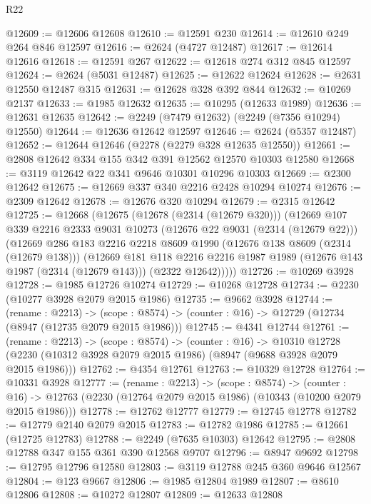 \begin{lexlean}{R22}
\begin{coremodule}
@12609 := @12606 @12608
@12610 := @12591 @230
@12614 := @12610 @249 @264 @846 @12597
@12616 := @2624 (@4727 @12487)
@12617 := @12614 @12616
@12618 := @12591 @267
@12622 := @12618 @274 @312 @845 @12597
@12624 := @2624 (@5031 @12487)
@12625 := @12622 @12624
@12628 := @2631 @12550 @12487 @315
@12631 := @12628 @328 @392 @844
@12632 := @10269 @2137
@12633 := @1985 @12632
@12635 := @10295 (@12633 @1989)
@12636 := @12631 @12635
@12642 := @2249 (@7479 @12632) (@2249 (@7356 @10294) @12550)
@12644 := @12636 @12642 @12597
@12646 := @2624 (@5357 @12487)
@12652 := @12644 @12646 (@2278 (@2279 @328 @12635 @12550))
@12661 := @2808 @12642 @334 @155 @342 @391 @12562 @12570 @10303 @12580
@12668 := @3119 @12642 @22 @341 @9646 @10301 @10296 @10303
@12669 := @2300 @12642
@12675 := @12669 @337 @340 @2216 @2428 @10294 @10274
@12676 := @2309 @12642
@12678 := @12676 @320 @10294
@12679 := @2315 @12642
@12725 := @12668
    (@12675
      (@12678 (@2314 (@12679 @320)))
      (@12669
        @107
        @339
        @2216
        @2333
        @9031
        @10273
        (@12676 @22 @9031 (@2314 (@12679 @22)))
        (@12669
          @286
          @183
          @2216
          @2218
          @8609
          @1990
          (@12676 @138 @8609 (@2314 (@12679 @138)))
          (@12669
            @181
            @118
            @2216
            @2216
            @1987
            @1989
            (@12676 @143 @1987 (@2314 (@12679 @143)))
            (@2322 @12642)))))
@12726 := @10269 @3928
@12728 := @1985 @12726 @10274
@12729 := @10268 @12728
@12734 := @2230 (@10277 @3928 @2079 @2015 @1986)
@12735 := @9662 @3928
@12744 := (rename : @2213) ->
  (scope : @8574) -> (counter : @16) -> @12729 (@12734 (@8947 (@12735 @2079 @2015 @1986)))
@12745 := @4341 @12744
@12761 := (rename : @2213) ->
  (scope : @8574) ->
  (counter : @16) ->
  @10310 @12728 (@2230 (@10312 @3928 @2079 @2015 @1986) (@8947 (@9688 @3928 @2079 @2015 @1986)))
@12762 := @4354 @12761
@12763 := @10329 @12728
@12764 := @10331 @3928
@12777 := (rename : @2213) ->
  (scope : @8574) ->
  (counter : @16) -> @12763 (@2230 (@12764 @2079 @2015 @1986) (@10343 (@10200 @2079 @2015 @1986)))
@12778 := @12762 @12777
@12779 := @12745 @12778
@12782 := @12779 @2140 @2079 @2015
@12783 := @12782 @1986
@12785 := @12661 (@12725 @12783)
@12788 := @2249 (@7635 @10303) @12642
@12795 := @2808 @12788 @347 @155 @361 @390 @12568 @9707
@12796 := @8947 @9692
@12798 := @12795 @12796 @12580
@12803 := @3119 @12788 @245 @360 @9646 @12567
@12804 := @123 @9667
@12806 := @1985 @12804 @1989
@12807 := @8610 @12806
@12808 := @10272 @12807
@12809 := @12633 @12808

\end{coremodule}
\end{lexlean}
